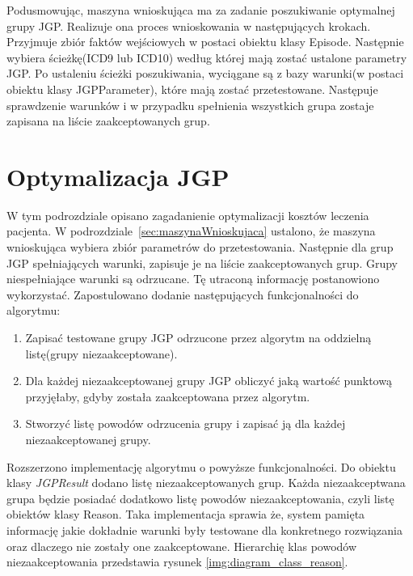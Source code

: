 Podusmowując, maszyna wnioskująca ma za zadanie poszukiwanie optymalnej grupy JGP. Realizuje ona proces wnioskowania w następujących krokach. Przyjmuje zbiór faktów wejściowych w postaci obiektu klasy Episode. Następnie wybiera ścieżkę(ICD9 lub ICD10) według której mają zostać ustalone parametry JGP. Po ustaleniu ścieżki poszukiwania, wyciągane są z bazy warunki(w postaci obiektu klasy JGPParameter), które mają zostać przetestowane. Następuje sprawdzenie warunków i w przypadku spełnienia wszystkich grupa zostaje zapisana na liście zaakceptowanych grup.


\section{Optymalizacja JGP}
\label{sec:optymalizacjaJGP}

W tym podrozdziale opisano zagadanienie optymalizacji kosztów leczenia pacjenta. W podrozdziale~\ref{sec:maszynaWnioskujaca} ustalono, że maszyna wnioskująca wybiera zbiór parametrów do przetestowania. Następnie dla grup JGP spełniających warunki, zapisuje je na liście zaakceptowanych grup.
Grupy niespełniające warunki są odrzucane. Tę utraconą informację postanowiono wykorzystać. Zapostulowano dodanie następujących funkcjonalności do algorytmu:
\begin{enumerate}
 \item Zapisać testowane grupy JGP odrzucone przez algorytm na oddzielną listę(grupy niezaakceptowane).
 \item Dla każdej niezaakceptowanej grupy JGP obliczyć jaką wartość punktową przyjęłaby, gdyby została zaakceptowana przez algorytm.
 \item Stworzyć listę powodów odrzucenia grupy i zapisać ją dla każdej niezaakceptowanej grupy.
\end{enumerate}

Rozszerzono implementację algorytmu o powyższe funkcjonalności. Do obiektu klasy \textit{JGPResult} dodano listę niezaakceptowanych grup. Każda niezaakceptwana grupa będzie posiadać dodatkowo listę powodów niezaakceptowania, czyli listę obiektów klasy Reason. 
Taka implementacja sprawia że, system pamięta informację jakie dokładnie warunki były testowane dla konkretnego rozwiązania oraz dlaczego nie zostały one zaakceptowane. Hierarchię klas powodów niezaakceptowania przedstawia rysunek \ref{img:diagram_class_reason}.

